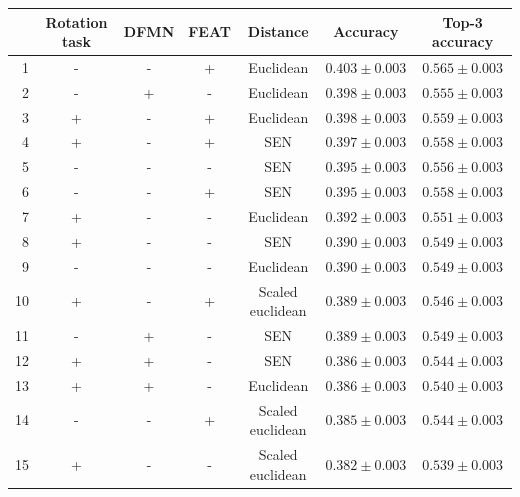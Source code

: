 \documentclass[a4paper, 12pt]{report}
\begin{document}
 \begin{table}[h!]
\begin{adjustbox}{center}
\begin{tabular}{| r | c c c c | c |  c | }
\hline
    & Rotation task   & DFMN   & FEAT   & Distance         & Accuracy         & Top-3 accuracy   \\
    \hline
  1 & -               & -      & +      & Euclidean        & $0.403 \pm 0.003$ & $0.565 \pm 0.003$ \\
    \hline
  2 & -               & +      & -      & Euclidean        & $0.398 \pm 0.003$ & $0.555 \pm 0.003$ \\
    \hline
  3 & +               & -      & +      & Euclidean        & $0.398 \pm 0.003$ & $0.559 \pm 0.003$ \\
    \hline
  4 & +               & -      & +      & SEN              & $0.397 \pm 0.003$ & $0.558 \pm 0.003$ \\
    \hline
  5 & -               & -      & -      & SEN              & $0.395 \pm 0.003$ & $0.556 \pm 0.003$ \\
    \hline
  6 & -               & -      & +      & SEN              & $0.395 \pm 0.003$ & $0.558 \pm 0.003$ \\
    \hline
  7 & +               & -      & -      & Euclidean        & $0.392 \pm 0.003$ & $0.551 \pm 0.003$ \\
    \hline
  8 & +               & -      & -      & SEN              & $0.390 \pm 0.003$ & $0.549 \pm 0.003$ \\
    \hline
  9 & -               & -      & -      & Euclidean        & $0.390 \pm 0.003$ & $0.549 \pm 0.003$ \\
    \hline
 10 & +               & -      & +      & Scaled euclidean & $0.389 \pm 0.003$ & $0.546 \pm 0.003$ \\
    \hline
 11 & -               & +      & -      & SEN              & $0.389 \pm 0.003$ & $0.549 \pm 0.003$ \\
    \hline
 12 & +               & +      & -      & SEN              & $0.386 \pm 0.003$ & $0.544 \pm 0.003$ \\
    \hline
 13 & +               & +      & -      & Euclidean        & $0.386 \pm 0.003$ & $0.540 \pm 0.003$ \\
    \hline
 14 & -               & -      & +      & Scaled euclidean & $0.385 \pm 0.003$ & $0.544 \pm 0.003$ \\
    \hline
 15 & +               & -      & -      & Scaled euclidean & $0.382 \pm 0.003$ & $0.539 \pm 0.003$ \\

\end{tabular}
\end{adjustbox}
\end{table}
\end{document}

